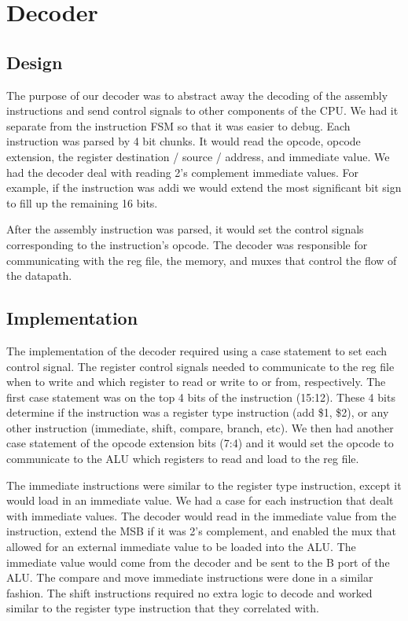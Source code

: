 \documentclass[letterpaper, 11 pt, conference]{article}
\begin{document}
\section{Decoder}

\subsection{Design}
The purpose of our decoder was to abstract away the decoding of the assembly instructions and send control signals to other components of the CPU. We had it separate from the instruction FSM so that it was easier to debug. Each instruction was parsed by 4 bit chunks. It would read the opcode,  opcode extension, the register destination / source / address, and immediate value. We had the decoder deal with reading 2’s complement immediate values. For example, if the instruction was addi we would extend the most significant bit sign to fill up the remaining 16 bits. 

After the assembly instruction was parsed, it would set the control signals corresponding to the instruction’s opcode. The decoder was responsible for communicating with the reg file, the memory, and muxes that control the flow of the datapath. 

\subsection{Implementation}
The implementation of the decoder required using a case statement to set each control signal. The register control signals needed to communicate to the reg file when to write and which register to read or write to or from, respectively. The first case statement was on the top 4 bits of the instruction (15:12). These 4 bits determine if the instruction was a register type instruction (add \$1, \$2), or any other instruction (immediate, shift, compare, branch, etc). We then had another case statement of the opcode extension bits (7:4) and it would set the opcode to communicate to the ALU which registers to read and load to the reg file.

The immediate instructions were similar to the register type instruction, except it would load in an immediate value. We had a case for each instruction that dealt with immediate values. The decoder would read in the immediate value from the instruction, extend the MSB if it was 2’s complement, and enabled the mux that allowed for an external immediate value to be loaded into the ALU. The immediate value would come from the decoder and be sent to the B port of the ALU. The compare and move immediate instructions were done in a similar fashion. The shift instructions required no extra logic to decode and worked similar to the register type instruction that they correlated with.
\end{document}
